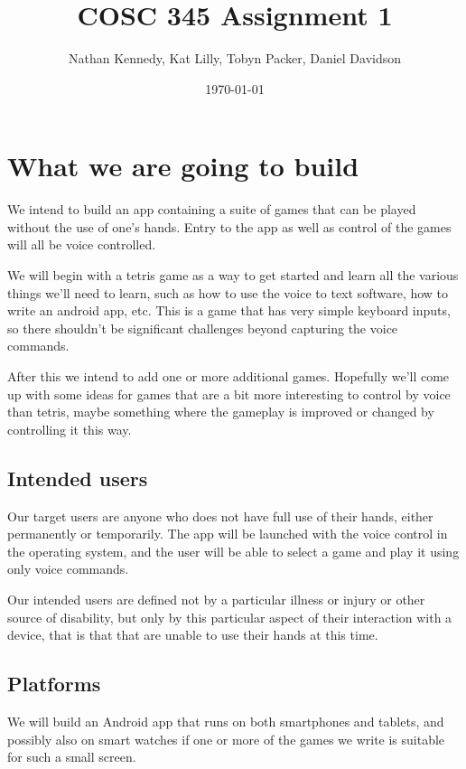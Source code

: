 \documentclass[11pt, oneside]{article}
\title{COSC 345 Assignment 1}
\author{Nathan Kennedy, Kat Lilly, Tobyn Packer, Daniel Davidson}
\date{\today}
\begin{document}
\maketitle

\section*{What we are going to build}

We intend to build an app containing a suite of games that can be
played without the use of one's hands. Entry to the app as well as
control of the games will all be voice controlled.

We will begin with a tetris game as a way to get started and learn all
the various things we'll need to learn, such as how to use the voice
to text software, how to write an android app, etc. This is a game
that has very simple keyboard inputs, so there shouldn't be
significant challenges beyond capturing the voice commands.

After this we intend to add one or more additional games. Hopefully
we'll come up with some ideas for games that are a bit more
interesting to control by voice than tetris, maybe something where the
gameplay is improved or changed by controlling it this way.

\subsection*{Intended users}

Our target users are anyone who does not have full use of their hands,
either permanently or temporarily. The app will be launched with the
voice control in the operating system, and the user will be able to
select a game and play it using only voice commands. 

Our intended users are defined not by a particular illness or injury or other source of disability, but only by this particular aspect of their interaction with a device, that is that that are unable to use their hands at this time.

\subsection*{Platforms}

We will build an Android app that runs on both smartphones and tablets, and possibly also on smart watches if one or more of the games we write is suitable for such a small screen.
\end{document}
